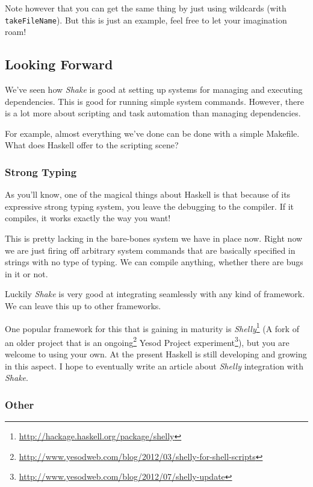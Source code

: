 \documentclass[]{article}
\renewcommand{\href}[2]{#2\footnote{\url{#1}}}
\begin{document}
Note however that you can get the same thing by just using wildcards (with
\texttt{takeFileName}). But this is just an example, feel free to let your
imagination roam!

\subsection{Looking Forward}\label{looking-forward}

We've seen how \emph{Shake} is good at setting up systems for managing and
executing dependencies. This is good for running simple system commands.
However, there is a lot more about scripting and task automation than managing
dependencies.

For example, almost everything we've done can be done with a simple Makefile.
What does Haskell offer to the scripting scene?

\subsubsection{Strong Typing}\label{strong-typing}

As you'll know, one of the magical things about Haskell is that because of its
expressive strong typing system, you leave the debugging to the compiler. If it
compiles, it works exactly the way you want!

This is pretty lacking in the bare-bones system we have in place now. Right now
we are just firing off arbitrary system commands that are basically specified in
strings with no type of typing. We can compile anything, whether there are bugs
in it or not.

Luckily \emph{Shake} is very good at integrating seamlessly with any kind of
framework. We can leave this up to other frameworks.

One popular framework for this that is gaining in maturity is
\href{http://hackage.haskell.org/package/shelly}{\emph{Shelly}} (A fork of an
older project that is an
\href{http://www.yesodweb.com/blog/2012/03/shelly-for-shell-scripts}{ongoing}
Yesod Project
\href{http://www.yesodweb.com/blog/2012/07/shelly-update}{experiment}), but you
are welcome to using your own. At the present Haskell is still developing and
growing in this aspect. I hope to eventually write an article about
\emph{Shelly} integration with \emph{Shake}.

\subsubsection{Other}\label{other}
\end{document}
